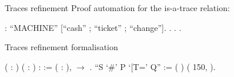 \documentclass[t]{beamer}
\begin{document}
\begin{frame}{Traces refinement}
	Proof automation for the is-a-trace relation: 
	\vskip 0.1in
	\begin{coqdoccode}
		\small
		\coqdocnoindent
		  :\coqdoceol
		\coqdocindent{1.00em}
		  ``MACHINE'' [``cash'' ; ``ticket'' ; ``change''].\coqdoceol
		\coqdocnoindent
		. . .\coqdoceol
	\end{coqdoccode}

	\vskip 0.2in
	Traces refinement formalisation
	\vskip 0.1in
	\begin{coqdoccode}
		\small
		\coqdocnoindent
		 \coqdoceol
		\coqdocindent{0.50em}( : ) (  : ) :  :=\coqdoceol
		\coqdocindent{1.00em}
		\coqdockw{\ensuremath{\forall}} ( : ),     \ensuremath{\rightarrow}    .\coqdoceol
		\coqdocemptyline
		\coqdocnoindent
		 ``S `\#' P `[T=' Q'' := (   )\coqdoceol
		\coqdocindent{1.00em}
		(  150,  ).\coqdoceol
	\end{coqdoccode}
\end{frame}
\end{document}
